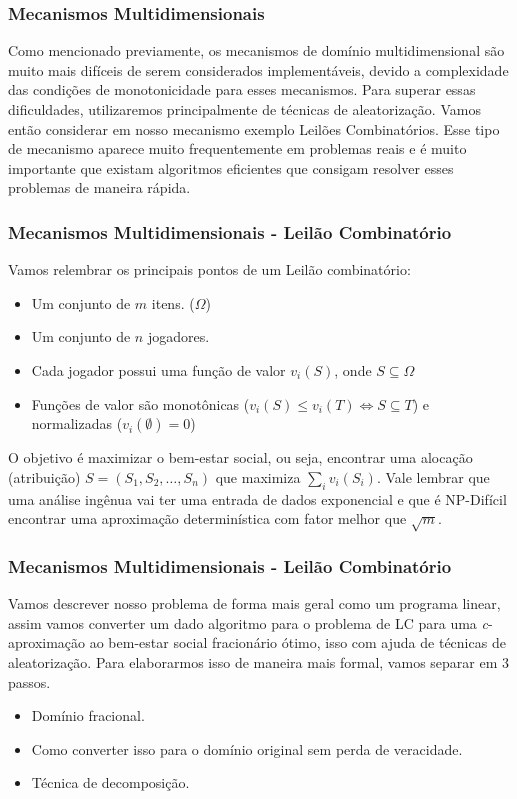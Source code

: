 \documentclass{beamer}
\begin{document}
\begin{frame}
    \frametitle{Mecanismos Multidimensionais}
    Como mencionado previamente, os mecanismos de domínio multidimensional são muito mais difíceis de serem considerados implementáveis, devido a complexidade das condições de monotonicidade para esses mecanismos. Para superar essas dificuldades, utilizaremos principalmente de técnicas de aleatorização. Vamos então considerar em nosso mecanismo exemplo Leilões Combinatórios. Esse tipo de mecanismo aparece muito frequentemente em problemas reais e é muito importante que existam algoritmos eficientes que consigam resolver esses problemas de maneira rápida.
\end{frame}

\begin{frame}
    \frametitle{Mecanismos Multidimensionais - Leilão Combinatório}
    Vamos relembrar os principais pontos de um Leilão combinatório:
    \begin{itemize}
        \item{Um conjunto de $m$ itens. ($\Omega$)}
        \item{Um conjunto de $n$ jogadores.}
        \item{Cada jogador possui uma função de valor $v_i(S)$, onde $S \subseteq \Omega$}
        \item{Funções de valor são monotônicas ($v_i(S) \leq v_i(T) \Leftrightarrow S \subseteq T$) e normalizadas ($v_i(\emptyset) = 0$)}
    \end{itemize}
    O objetivo é maximizar o bem-estar social, ou seja, encontrar uma alocação (atribuição) $S = (S_1, S_2, \ldots, S_n)$ que maximiza $\sum_{i}{v_i(S_i)}$. Vale lembrar que uma análise ingênua vai ter uma entrada de dados exponencial e que é NP-Difícil encontrar uma aproximação determinística com fator melhor que $\sqrt{m}$.
\end{frame}

\begin{frame}
    \frametitle{Mecanismos Multidimensionais - Leilão Combinatório}
    Vamos descrever nosso problema de forma mais geral como um programa linear, assim vamos converter um dado algoritmo para o problema de LC para uma \textit{c}-aproximação ao bem-estar social fracionário ótimo, isso com ajuda de técnicas de aleatorização. Para elaborarmos isso de maneira mais formal, vamos separar em 3 passos.
    \begin{itemize}
        \item{Domínio fracional.}
        \item{Como converter isso para o domínio original sem perda de veracidade.}
        \item{Técnica de decomposição.}
    \end{itemize}
\end{frame}
\end{document}
